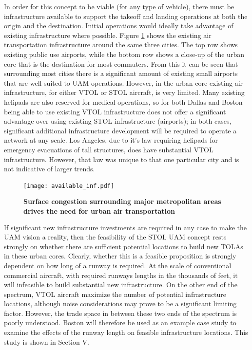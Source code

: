 \documentclass[]{aiaa-tc}%
\begin{document}
In order for this concept to be viable (for any type of vehicle), there must be infrastructure available to support the takeoff and landing operations at both the origin and the destination.  Initial operations would ideally take advantage of existing infrastructure where possible. Figure \ref{f:inf_avail} shows the existing air transportation infrastructure around the same three cities.  The top row shows existing public use airports, while the bottom row shows a close-up of the urban core that is the destination for most commuters.  From this it can be seen that surrounding most cities there is a significant amount of existing small airports that are well suited to UAM operations.  However, in the urban core existing air infrastructure, for either VTOL or STOL aircraft, is very limited.  Many existing helipads are also reserved for medical operations, so for both Dallas and Boston being able to use existing VTOL infrastructure does not offer a significant advantage over using existing STOL infrastructure (airports); in both cases, significant additional infrastructure development will be required to operate a network at any scale.  Los Angeles, due to it's law requiring helipads for emergency evacuations of tall structures, does have substantial VTOL infrastructure.   However, that law was unique to that one particular city and is not indicative of larger trends\cite{Vascik2017}.

\begin{figure}[h!]
	\begin{center}
	\texttt{[image: available\_inf.pdf]}
    \caption{\textbf{Surface congestion surrounding major metropolitan areas drives the need for urban air transportation}}
	\label{f:inf_avail}
	\end{center}
\end{figure}

If significant new infrastructure investments are required in any case to make the UAM vision a reality, then the feasibility of the STOL UAM concept rests strongly on whether there are sufficient potential locations to build new TOLAs in these urban cores.  Clearly, whether this is a feasible proposition is strongly dependent on how long of a runway is required.  At the scale of conventional commercial aircraft, with required runways lengths in the thousands of feet, it will infeasible to build substantial new infrastructure.  On the other end of the spectrum, VTOL aircraft maximize the number of potential infrastructure locations, although noise considerations may prove to be a significant limiting factor.  However, the trade space in between these two ends of the spectrum is poorly understood. Boston will therefore be used as an example case study to examine the effects of the runway length on feasible infrastructure locations.  This study is shown in Section V.   
\end{document}
